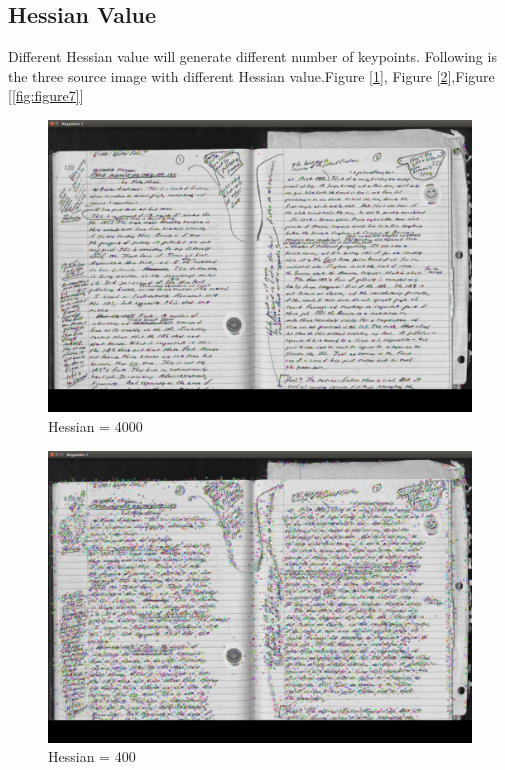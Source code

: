 \documentclass[journal]{IEEEtran}
\begin{document}
\subsection*{Hessian Value}
Different Hessian value will generate different number of keypoints. Following is the three source image with different Hessian value.Figure [\ref{fig:figure5}], Figure [\ref{fig:figure6}],Figure [\ref{fig:figure7}]
		\begin{figure}[h]
			\centering
			\includegraphics[scale=0.15]{Figure/4000.png}
			\caption{Hessian = 4000}
			\label{fig:figure5}
		\end{figure} 
		\begin{figure}[h]
			\centering
			\includegraphics[scale=0.15]{Figure/400.png}
			\caption{Hessian = 400}
			\label{fig:figure6}
		\end{figure} 
\end{document}
